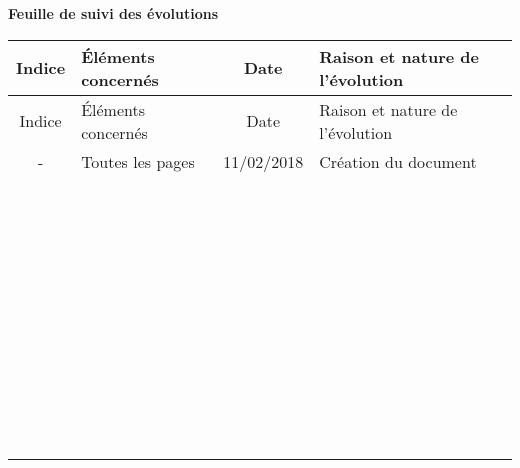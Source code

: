 \begin{center}\bfseries\Huge
    Feuille de suivi des évolutions
\end{center}
\begin{longtable}{|c|p{3.5cm}|c|p{9cm}|}
  \hline
  Indice & Éléments concernés & Date & Raison et nature de l'évolution \\ \endfirsthead \hline
  Indice & Éléments concernés & Date & Raison et nature de l'évolution \\ \endhead \hline
  - & Toutes les pages & 11/02/2018 & Création du document\\
   & & & \\
   & & & \\
   & & & \\
   & & & \\
   & & & \\
   & & & \\
   & & & \\
   & & & \\
   & & & \\
   & & & \\
   & & & \\
   & & & \\
   & & & \\
   & & & \\
   & & & \\
   & & & \\
   & & & \\
   & & & \\
   & & & \\
   & & & \\
   & & & \\
   & & & \\
   & & & \\
   & & & \\
   & & & \\
   & & & \\
   & & & \\
   & & & \\
   & & & \\
   & & & \\
   & & & \\
   & & & \\
   & & & \\
   & & & \\
   & & & \\
   & & & \\
   & & & \\
   & & & \\
   & & & \\
   & & & \\
   & & & \\
   & & & \\
   & & & \\
   & & & \\
   & & & \\
   & & & \\
   & & & \\ \hline
\end{longtable}
